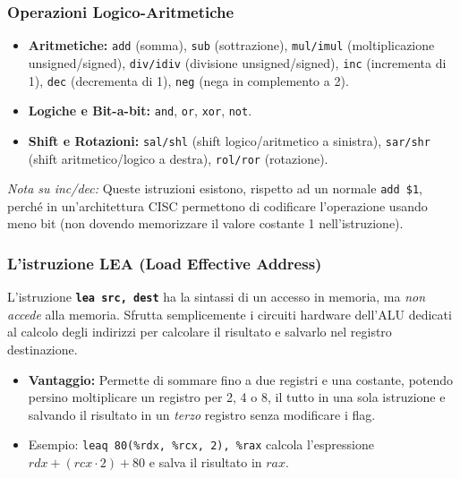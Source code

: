 \documentclass[12pt, a4paper]{article}
\begin{document}
\subsubsection{Operazioni Logico-Aritmetiche}
\begin{itemize}
    \item \textbf{Aritmetiche:} \texttt{add} (somma), \texttt{sub} (sottrazione), \texttt{mul/imul} (moltiplicazione unsigned/signed), \texttt{div/idiv} (divisione unsigned/signed), \texttt{inc} (incrementa di 1), \texttt{dec} (decrementa di 1), \texttt{neg} (nega in complemento a 2).
    \item \textbf{Logiche e Bit-a-bit:} \texttt{and}, \texttt{or}, \texttt{xor}, \texttt{not}.
    \item \textbf{Shift e Rotazioni:} \texttt{sal/shl} (shift logico/aritmetico a sinistra), \texttt{sar/shr} (shift aritmetico/logico a destra), \texttt{rol/ror} (rotazione).
\end{itemize}
\textit{Nota su inc/dec:} Queste istruzioni esistono, rispetto ad un normale \texttt{add \$1}, perché in un'architettura CISC permettono di codificare l'operazione usando meno bit (non dovendo memorizzare il valore costante 1 nell'istruzione).

\subsubsection{L'istruzione LEA (Load Effective Address)}
L'istruzione \texttt{\textbf{lea src, dest}} ha la sintassi di un accesso in memoria, ma \textit{non accede} alla memoria. Sfrutta semplicemente i circuiti hardware dell'ALU dedicati al calcolo degli indirizzi per calcolare il risultato e salvarlo nel registro destinazione.
\begin{itemize}
    \item \textbf{Vantaggio:} Permette di sommare fino a due registri e una costante, potendo persino moltiplicare un registro per 2, 4 o 8, il tutto in una sola istruzione e salvando il risultato in un \textit{terzo} registro senza modificare i flag.
    \item Esempio: \texttt{leaq 80(\%rdx, \%rcx, 2), \%rax} calcola l'espressione $rdx + (rcx \cdot 2) + 80$ e salva il risultato in $rax$.
\end{itemize}
\end{document}
